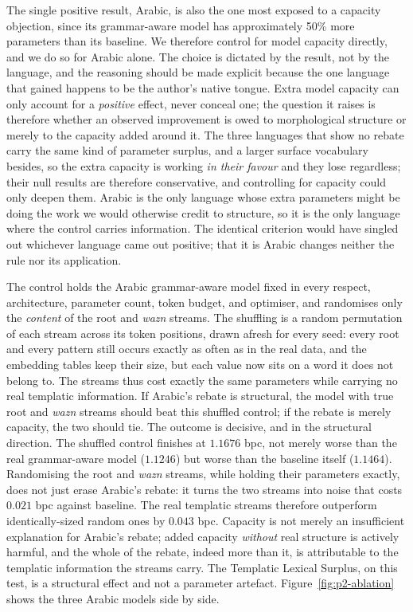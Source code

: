 The single positive result, Arabic, is also the one most exposed to a capacity objection, since its grammar-aware model has approximately 50\% more parameters than its baseline. We therefore control for model capacity directly, and we do so for Arabic alone. The choice is dictated by the result, not by the language, and the reasoning should be made explicit because the one language that gained happens to be the author's native tongue. Extra model capacity can only account for a \emph{positive} effect, never conceal one; the question it raises is therefore whether an observed improvement is owed to morphological structure or merely to the capacity added around it. The three languages that show no rebate carry the same kind of parameter surplus, and a larger surface vocabulary besides, so the extra capacity is working \emph{in their favour} and they lose regardless; their null results are therefore conservative, and controlling for capacity could only deepen them. Arabic is the only language whose extra parameters might be doing the work we would otherwise credit to structure, so it is the only language where the control carries information. The identical criterion would have singled out whichever language came out positive; that it is Arabic changes neither the rule nor its application.

The control holds the Arabic grammar-aware model fixed in every respect, architecture, parameter count, token budget, and optimiser, and randomises only the \emph{content} of the root and \emph{wazn} streams. The shuffling is a random permutation of each stream across its token positions, drawn afresh for every seed: every root and every pattern still occurs exactly as often as in the real data, and the embedding tables keep their size, but each value now sits on a word it does not belong to. The streams thus cost exactly the same parameters while carrying no real templatic information. If Arabic's rebate is structural, the model with true root and \emph{wazn} streams should beat this shuffled control; if the rebate is merely capacity, the two should tie. The outcome is decisive, and in the structural direction. The shuffled control finishes at $1.1676$ bpc, not merely worse than the real grammar-aware model ($1.1246$) but worse than the baseline itself ($1.1464$). Randomising the root and \emph{wazn} streams, while holding their parameters exactly, does not just erase Arabic's rebate: it turns the two streams into noise that costs $0.021$ bpc against baseline. The real templatic streams therefore outperform identically-sized random ones by $0.043$ bpc. Capacity is not merely an insufficient explanation for Arabic's rebate; added capacity \emph{without} real structure is actively harmful, and the whole of the rebate, indeed more than it, is attributable to the templatic information the streams carry. The Templatic Lexical Surplus, on this test, is a structural effect and not a parameter artefact. Figure~\ref{fig:p2-ablation} shows the three Arabic models side by side.

